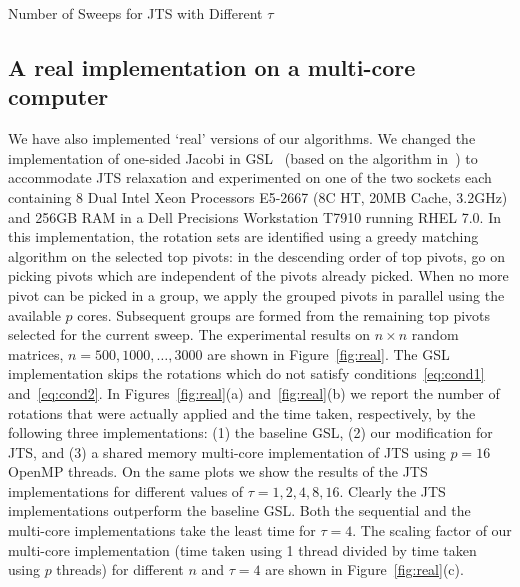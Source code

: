 \documentclass[10pt, conference, compsocconf]{IEEEtran}
\begin{document}

\begin{table}
  \centering
  \caption{Number of Sweeps for JTS with Different $\tau$}
  \label{tab:varyk}
  
\end{table}

\subsection{A real implementation on a multi-core computer}

We have also implemented `real' versions of our algorithms. We changed the implementation of one-sided Jacobi in GSL~\cite{galassi1996gnu} (based on the algorithm in~\cite{nash1975one}) to accommodate JTS relaxation and experimented on one of the two sockets each containing 8 Dual Intel Xeon Processors E5-2667 (8C HT, 20MB Cache, 3.2GHz) and 256GB RAM in a Dell Precisions Workstation T7910 running RHEL 7.0. In this implementation, the rotation sets are identified using a greedy matching algorithm on the selected top pivots: in the descending order of top pivots, go on picking pivots which are independent of the pivots already picked. When no more pivot can be picked in a group, we apply the grouped pivots in parallel using the available $p$ cores. Subsequent groups are formed from the remaining top pivots selected for the current sweep. The experimental results on $n \times n$ random matrices, $n=500, 1000, \ldots, 3000$ are shown in Figure~\ref{fig:real}. The GSL implementation skips the rotations which do not satisfy conditions~\eqref{eq:cond1} and~\eqref{eq:cond2}. In Figures~\ref{fig:real}(a) and~\ref{fig:real}(b) we report the number of rotations that were actually applied and the time taken, respectively, by the following three implementations: (1) the baseline GSL, (2) our modification for JTS, and (3) a shared memory multi-core implementation of JTS using $p{=}16$ OpenMP threads. On the same plots we show the results of the JTS implementations for different values of $\tau {=} 1, 2, 4, 8, 16$. Clearly the JTS implementations outperform the baseline GSL. Both the sequential and the multi-core implementations take the least time for $\tau {=} 4$. The scaling factor of our multi-core implementation (time taken using 1 thread divided by time taken using $p$ threads) for different $n$ and $\tau=4$ are shown in Figure~\ref{fig:real}(c).
\end{document}
